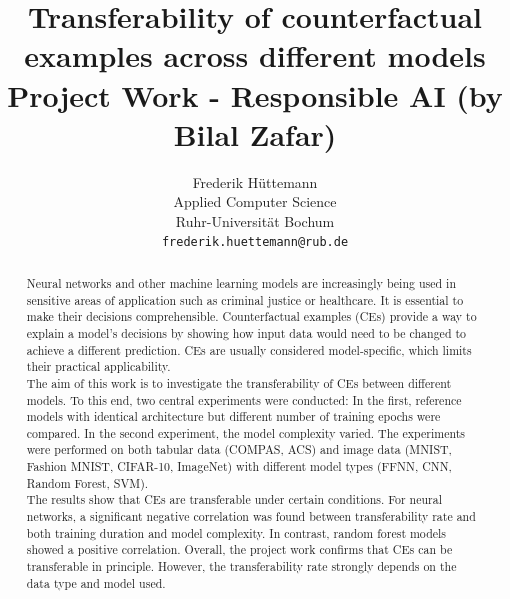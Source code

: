 \documentclass{article}
\title{
  Transferability of counterfactual examples across different models\\
  \vspace{1em}
  \small{\normalfont Project Work - Responsible AI (by Bilal Zafar)}
}
\author{
  Frederik Hüttemann \\
  Applied Computer Science\\
  Ruhr-Universität Bochum \\
  \texttt{frederik.huettemann@rub.de} \\
}
\begin{document}
\maketitle

\begin{abstract}
Neural networks and other machine learning models are increasingly being used in sensitive areas of application such as criminal justice or healthcare. It is essential to make their decisions comprehensible. Counterfactual examples (CEs) provide a way to explain a model's decisions by showing how input data would need to be changed to achieve a different prediction. CEs are usually considered model-specific, which limits their practical applicability.\\
The aim of this work is to investigate the transferability of CEs between different models. To this end, two central experiments were conducted: In the first, reference models with identical architecture but different number of training epochs were compared. In the second experiment, the model complexity varied. The experiments were performed on both tabular data (COMPAS, ACS) and image data (MNIST, Fashion MNIST, CIFAR-10, ImageNet) with different model types (FFNN, CNN, Random Forest, SVM). \\
The results show that CEs are transferable under certain conditions. For neural networks, a significant negative correlation was found between transferability rate and both training duration and model complexity. In contrast, random forest models showed a positive correlation. Overall, the project work confirms that CEs can be transferable in principle. However, the transferability rate strongly depends on the data type and model used.\\

\end{abstract}
\end{document}
